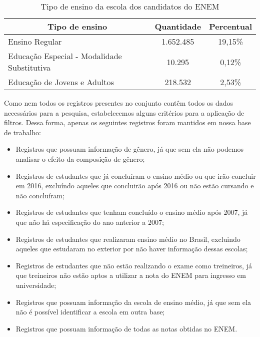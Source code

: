     \begin{table}[h]
      \begin{tabular}{lcc}
      \hline
      \multicolumn{1}{c}{\textbf{Tipo de ensino}} & \multicolumn{1}{c}{\textbf{Quantidade}} & \multicolumn{1}{c}{\textbf{Percentual}} \\ \hline
      Ensino Regular                              & 1.652.485                                 & 19,15\%                                 \\ \hline
      Educação Especial - Modalidade Substitutiva & 10.295                                   & 0,12\%                                  \\ \hline
      Educação de Jovens e Adultos                & 218.532                                  & 2,53\%                                  \\ \hline
      \end{tabular}
      \caption{Tipo de ensino da escola dos candidatos do ENEM}
      \label{tab:tipo-ensino}
      \end{table}

Como nem todos os registros presentes no conjunto contêm todos os dados necessários para a pesquisa, estabelecemos alguns critérios para a aplicação de filtros. Dessa forma, apenas os seguintes registros foram mantidos em nossa base de trabalho:
\begin{itemize}
  \item Registros que possuam informação de gênero, já que sem ela não podemos analisar o efeito da composição de gênero;
  \item Registros de estudantes que já concluíram o ensino médio ou que irão concluir em 2016, excluíndo aqueles que concluirão após 2016 ou não estão cursando e não concluíram; 
  \item Registros de estudantes que tenham concluído o ensino médio após 2007, já que não há especificação do ano anterior a 2007;
  \item Registros de estudantes que realizaram ensino médio no Brasil, excluindo aqueles que estudaram no exterior por não haver informação dessas escolas;
  \item Registros de estudantes que não estão realizando o exame como treineiros, já que treineiros não estão aptos a utilizar a nota do ENEM para ingresso em universidade;
  \item Registros que possuam informação da escola de ensino médio, já que sem ela não é possível identificar a escola em outra base;
  \item Registros que possuam informação de todas as notas obtidas no ENEM.
\end{itemize}

